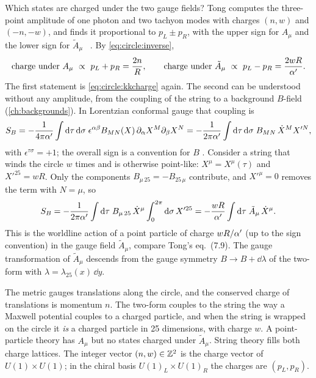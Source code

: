 Which states are charged under the two gauge fields? Tong computes the three-point
amplitude of one photon and two tachyon modes with charges $(n,w)$ and $(-n,-w)$, and finds
it proportional to $p_L\pm p_R$, with the upper sign for $A_\mu$ and the lower sign for
$\tilde A_\mu$ \TL\ . By \eqref{eq:circle:inverse},
\begin{equation}\label{eq:circle:charges}
 \text{charge under }A_\mu\ \propto\ p_L+p_R=\frac{2n}{R},\qquad
 \text{charge under }\tilde A_\mu\ \propto\ p_L-p_R=\frac{2wR}{\ap}.
\end{equation}
The first statement is
\eqref{eq:circle:kkcharge} again. The second can be understood without any amplitude, from
the coupling of the string to a background $B$-field (\cref{ch:backgrounds}). In Lorentzian
conformal gauge that coupling is
\begin{equation}\label{eq:circle:Bcoupling}
 S_B=-\frac{1}{4\pi\alpha'}\int\mathrm{d}\tau\,\mathrm{d}\sigma\;\epsilon^{\alpha\beta}
     B_{MN}(X)\,\partial_\alpha X^M\partial_\beta X^N
    =-\frac{1}{2\pi\alpha'}\int\mathrm{d}\tau\,\mathrm{d}\sigma\;B_{MN}\,\dot X^MX'^N ,
\end{equation}
with $\epsilon^{\tau\sigma}=+1$; the overall sign is a convention for $B$
. Consider a string that winds the circle $w$
times and is otherwise point-like: $X^\mu=X^\mu(\tau)$ and $X'^{25}=wR$. Only the components
$B_{\mu\,25}=-B_{25\,\mu}$ contribute, and $X'^\mu=0$ removes the term with $N=\mu$, so
\begin{equation}\label{eq:circle:windingcharge}
 S_B=-\frac{1}{2\pi\alpha'}\int\mathrm{d}\tau\;B_{\mu\,25}\,\dot X^\mu\int_0^{2\pi}\mathrm{d}\sigma\,X'^{25}
    =-\frac{wR}{\alpha'}\int\mathrm{d}\tau\;\tilde A_\mu\,\dot X^\mu .
\end{equation}
This is the worldline action of a point particle of charge $wR/\alpha'$ (up to the sign
convention) in the gauge field $\tilde A_\mu$, compare Tong's eq.~(7.9). The gauge
transformation of $\tilde A_\mu$ descends from the gauge symmetry
$B\to B+\dd\lambda$ of the two-form with $\lambda=\lambda_{25}(x)\,\dd y$.

\begin{physicsbox}
The metric gauges translations along the circle, and the conserved charge of translations is
momentum $n$. The two-form couples to the string the way a Maxwell potential couples to a
charged particle, and when the string is wrapped on the circle it \emph{is} a charged
particle in 25 dimensions, with charge $w$. A point-particle theory has $A_\mu$ but no
states charged under $\tilde A_\mu$. String theory fills both charge lattices. The integer
vector $(n,w)\in\mathbb{Z}^2$ is the charge vector of $U(1)\times U(1)$; in the chiral basis
$U(1)_L\times U(1)_R$ the charges are $(p_L,p_R)$.
\end{physicsbox}

